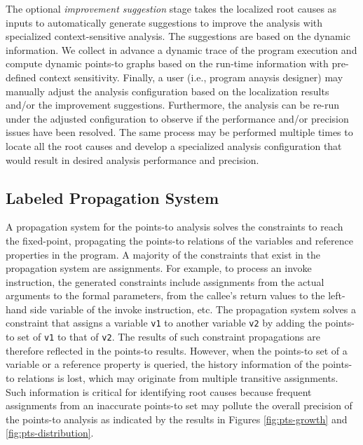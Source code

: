 The optional {\it improvement suggestion} stage takes the localized root causes as inputs to automatically generate suggestions to improve the analysis with specialized context-sensitive analysis. The suggestions are based on the dynamic information. We collect in advance a dynamic trace of the program execution and compute dynamic points-to graphs based on the run-time information with pre-defined context sensitivity. Finally, a user (i.e., program anaysis designer) may manually adjust the analysis configuration based on the localization results and/or the improvement suggestions. Furthermore, the analysis can be re-run under the adjusted configuration to observe if the performance and/or precision issues have been resolved. The same process may be performed multiple times to locate all the root causes and develop a specialized analysis configuration that would result in desired analysis performance and precision.

\subsection{Labeled Propagation System}

A propagation system for the points-to analysis solves the constraints to reach the fixed-point, propagating the points-to relations of the variables and reference properties in the program. A majority of the constraints that exist in the propagation system are assignments. For example, to process an invoke instruction, the generated constraints include assignments from the actual arguments to the formal parameters, from the callee's return values to the left-hand side variable of the invoke instruction, etc. The propagation system solves a constraint that assigns a variable {\tt v1} to another variable {\tt v2} by adding the points-to set of {\tt v1} to that of {\tt v2}. The results of such constraint propagations are therefore reflected in the points-to results. However, when the points-to set of a variable or a reference property is queried, the history information of the points-to relations is lost, which may originate from multiple transitive assignments. Such information is critical for identifying root causes because frequent assignments from an inaccurate points-to set may pollute the overall precision of the points-to analysis as indicated by the results in Figures \ref{fig:pts-growth} and \ref{fig:pts-distribution}.

